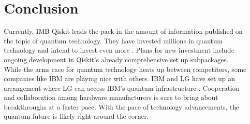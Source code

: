\documentclass[conference]{IEEEtran}
\begin{document}
\section{Conclusion}
Currently, IMB Qiskit leads the pack in the amount of information published on the topic of quantum technology. 
They have invested millions in quantum technology and intend to invest even more \cite{b15}. 
Plans for new investment include ongoing development in Qiskit's already comprehensive set up subpackages.
While the arms race for quantum technology heats up between competitors, some companies like IBM are playing nice with others. 
IBM and LG have set up an arrangement where LG can access IBM's quantum infrastructure \cite{b15}. 
Cooperation and collaboration among hardware manufacturers is sure to bring about breakthroughs at a faster pace.
With the pace of technology advancements, the quantum future is likely right around the corner. 
\end{document}

